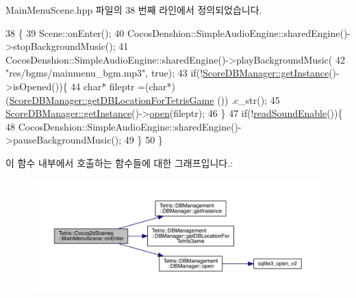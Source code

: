 Main\+Menu\+Scene.\+hpp 파일의 38 번째 라인에서 정의되었습니다.


\begin{DoxyCode}
38                           \{
39         Scene::onEnter();
40         CocosDenshion::SimpleAudioEngine::sharedEngine()->stopBackgroundMusic();
41         CocosDenshion::SimpleAudioEngine::sharedEngine()->playBackgroundMusic(
42                                                                               \textcolor{stringliteral}{"res/bgms/mainmenu\_bgm.mp3"}, \textcolor{keyword}{
      true});
43         \textcolor{keywordflow}{if}(!\hyperlink{class_tetris_1_1_d_b_management_1_1_d_b_manager_a9cb81505055490211a9b5c79c3c22c18}{ScoreDBManager::getInstance}()->isOpened())\{
44             \textcolor{keywordtype}{char}* fileptr =(\textcolor{keywordtype}{char}*) (\hyperlink{class_tetris_1_1_d_b_management_1_1_d_b_manager_ae50cfd222e276a5ca27e17c886aa5dd5}{ScoreDBManager::getDBLocationForTetrisGame}
      ()) .c\_str();
45             \hyperlink{class_tetris_1_1_d_b_management_1_1_d_b_manager_a9cb81505055490211a9b5c79c3c22c18}{ScoreDBManager::getInstance}()->\hyperlink{class_tetris_1_1_d_b_management_1_1_d_b_manager_a8bf7e756a9cca7e57fef00076fb62f36}{open}(fileptr);
46         \}
47         \textcolor{keywordflow}{if}(!\hyperlink{class_tetris_1_1_cocos2d_scenes_1_1_main_menu_scene_a0454c0398dc84b0c8f9e1b3ff72da69d}{readSoundEnable}())\{
48             CocosDenshion::SimpleAudioEngine::sharedEngine()->pauseBackgroundMusic();
49         \}
50     \}
\end{DoxyCode}
이 함수 내부에서 호출하는 함수들에 대한 그래프입니다.\+:
\nopagebreak
\begin{figure}[H]
\begin{center}
\leavevmode
\includegraphics[width=350pt]{dc/d34/class_tetris_1_1_cocos2d_scenes_1_1_main_menu_scene_a63cfd0adc032b868536a89b103c44fc5_cgraph}
\end{center}
\end{figure}
\mbox{\label{class_tetris_1_1_cocos2d_scenes_1_1_main_menu_scene_a021af73aac74c3e90113812882b3e0bb}} 
